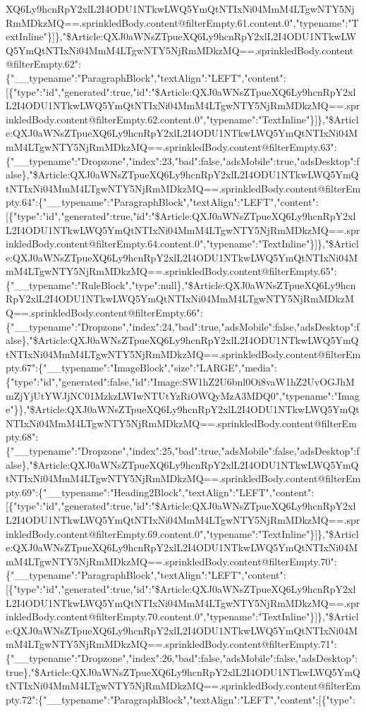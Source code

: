 XQ6Ly9hcnRpY2xlL2I4ODU1NTkwLWQ5YmQtNTIxNi04MmM4LTgwNTY5NjRmMDkzMQ==.sprinkledBody.content@filterEmpty.61.content.0","typename":"TextInline"\}{]}\},"\$Article:QXJ0aWNsZTpueXQ6Ly9hcnRpY2xlL2I4ODU1NTkwLWQ5YmQtNTIxNi04MmM4LTgwNTY5NjRmMDkzMQ==.sprinkledBody.content@filterEmpty.62":\{"\_\_typename":"ParagraphBlock","textAlign":"LEFT","content":{[}\{"type":"id","generated":true,"id":"\$Article:QXJ0aWNsZTpueXQ6Ly9hcnRpY2xlL2I4ODU1NTkwLWQ5YmQtNTIxNi04MmM4LTgwNTY5NjRmMDkzMQ==.sprinkledBody.content@filterEmpty.62.content.0","typename":"TextInline"\}{]}\},"\$Article:QXJ0aWNsZTpueXQ6Ly9hcnRpY2xlL2I4ODU1NTkwLWQ5YmQtNTIxNi04MmM4LTgwNTY5NjRmMDkzMQ==.sprinkledBody.content@filterEmpty.63":\{"\_\_typename":"Dropzone","index":23,"bad":false,"adsMobile":true,"adsDesktop":false\},"\$Article:QXJ0aWNsZTpueXQ6Ly9hcnRpY2xlL2I4ODU1NTkwLWQ5YmQtNTIxNi04MmM4LTgwNTY5NjRmMDkzMQ==.sprinkledBody.content@filterEmpty.64":\{"\_\_typename":"ParagraphBlock","textAlign":"LEFT","content":{[}\{"type":"id","generated":true,"id":"\$Article:QXJ0aWNsZTpueXQ6Ly9hcnRpY2xlL2I4ODU1NTkwLWQ5YmQtNTIxNi04MmM4LTgwNTY5NjRmMDkzMQ==.sprinkledBody.content@filterEmpty.64.content.0","typename":"TextInline"\}{]}\},"\$Article:QXJ0aWNsZTpueXQ6Ly9hcnRpY2xlL2I4ODU1NTkwLWQ5YmQtNTIxNi04MmM4LTgwNTY5NjRmMDkzMQ==.sprinkledBody.content@filterEmpty.65":\{"\_\_typename":"RuleBlock","type":null\},"\$Article:QXJ0aWNsZTpueXQ6Ly9hcnRpY2xlL2I4ODU1NTkwLWQ5YmQtNTIxNi04MmM4LTgwNTY5NjRmMDkzMQ==.sprinkledBody.content@filterEmpty.66":\{"\_\_typename":"Dropzone","index":24,"bad":true,"adsMobile":false,"adsDesktop":false\},"\$Article:QXJ0aWNsZTpueXQ6Ly9hcnRpY2xlL2I4ODU1NTkwLWQ5YmQtNTIxNi04MmM4LTgwNTY5NjRmMDkzMQ==.sprinkledBody.content@filterEmpty.67":\{"\_\_typename":"ImageBlock","size":"LARGE","media":\{"type":"id","generated":false,"id":"Image:SW1hZ2U6bnl0Oi8vaW1hZ2UvOGJhMmZjYjUtYWJjNC01MzkzLWIwNTUtYzRiOWQyMzA3MDQ0","typename":"Image"\}\},"\$Article:QXJ0aWNsZTpueXQ6Ly9hcnRpY2xlL2I4ODU1NTkwLWQ5YmQtNTIxNi04MmM4LTgwNTY5NjRmMDkzMQ==.sprinkledBody.content@filterEmpty.68":\{"\_\_typename":"Dropzone","index":25,"bad":true,"adsMobile":false,"adsDesktop":false\},"\$Article:QXJ0aWNsZTpueXQ6Ly9hcnRpY2xlL2I4ODU1NTkwLWQ5YmQtNTIxNi04MmM4LTgwNTY5NjRmMDkzMQ==.sprinkledBody.content@filterEmpty.69":\{"\_\_typename":"Heading2Block","textAlign":"LEFT","content":{[}\{"type":"id","generated":true,"id":"\$Article:QXJ0aWNsZTpueXQ6Ly9hcnRpY2xlL2I4ODU1NTkwLWQ5YmQtNTIxNi04MmM4LTgwNTY5NjRmMDkzMQ==.sprinkledBody.content@filterEmpty.69.content.0","typename":"TextInline"\}{]}\},"\$Article:QXJ0aWNsZTpueXQ6Ly9hcnRpY2xlL2I4ODU1NTkwLWQ5YmQtNTIxNi04MmM4LTgwNTY5NjRmMDkzMQ==.sprinkledBody.content@filterEmpty.70":\{"\_\_typename":"ParagraphBlock","textAlign":"LEFT","content":{[}\{"type":"id","generated":true,"id":"\$Article:QXJ0aWNsZTpueXQ6Ly9hcnRpY2xlL2I4ODU1NTkwLWQ5YmQtNTIxNi04MmM4LTgwNTY5NjRmMDkzMQ==.sprinkledBody.content@filterEmpty.70.content.0","typename":"TextInline"\}{]}\},"\$Article:QXJ0aWNsZTpueXQ6Ly9hcnRpY2xlL2I4ODU1NTkwLWQ5YmQtNTIxNi04MmM4LTgwNTY5NjRmMDkzMQ==.sprinkledBody.content@filterEmpty.71":\{"\_\_typename":"Dropzone","index":26,"bad":false,"adsMobile":false,"adsDesktop":true\},"\$Article:QXJ0aWNsZTpueXQ6Ly9hcnRpY2xlL2I4ODU1NTkwLWQ5YmQtNTIxNi04MmM4LTgwNTY5NjRmMDkzMQ==.sprinkledBody.content@filterEmpty.72":\{"\_\_typename":"ParagraphBlock","textAlign":"LEFT","content":{[}\{"type":